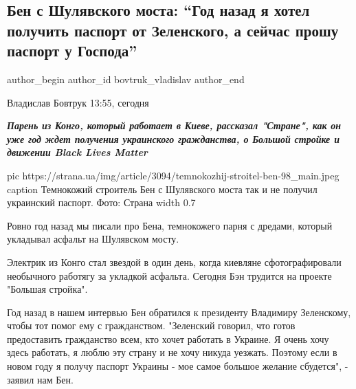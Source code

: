 
 
 
 
 
 
\subsection{Бен с Шулявского моста: \enquote{Год назад я хотел получить паспорт от Зеленского, а сейчас прошу паспорт у Господа}}
\label{sec:31_12_2020.news.ua.strana.bovtruk_vladislav.1.ben_s_shuljavskogo_mosta}
\ifcmt
	author_begin
   author_id bovtruk_vladislav
	author_end
\fi

Владислав Бовтрук 13:55, сегодня

\begin{leftbar}
  \begingroup
    \em\Large\bfseries\color{blue}
Парень из Конго, который работает в Киеве, рассказал "Стране", как он уже год
ждет получения украинского гражданства, о Большой стройке и движении Black
Lives Matter
  \endgroup
\end{leftbar}

\ifcmt
  pic https://strana.ua/img/article/3094/temnokozhij-stroitel-ben-98_main.jpeg
	caption Темнокожий строитель Бен с Шулявского моста так и не получил украинский паспорт. Фото: Страна 
  width 0.7
\fi

Ровно год назад мы писали про Бена, темнокожего парня с дредами, который
укладывал асфальт на Шулявском мосту.  

Электрик из Конго стал звездой в один день, когда киевляне сфотографировали
необычного работягу за укладкой асфальта. Сегодня Бэн трудится на проекте
"Большая стройка".

Год назад в нашем интервью Бен обратился к президенту Владимиру
Зеленскому, чтобы тот помог ему с гражданством. "Зеленский говорил, что
готов предоставить гражданство всем, кто хочет работать в Украине. Я очень
хочу здесь работать, я люблю эту страну и не хочу никуда уезжать. Поэтому
если в новом году я получу паспорт Украины - мое самое большое желание
сбудется", - заявил нам Бен.

